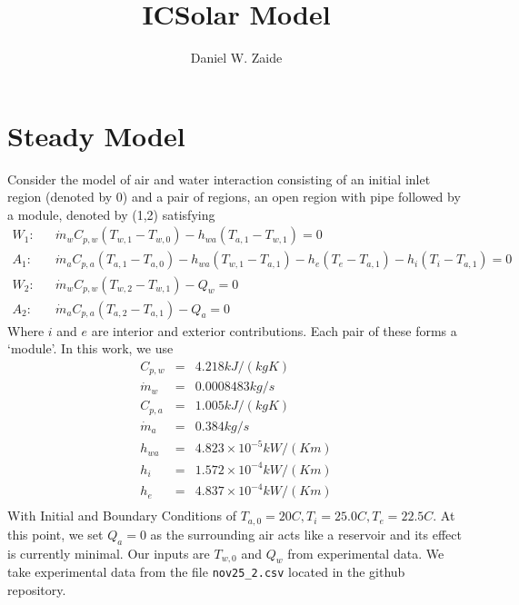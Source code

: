 \documentclass[11pt]{article}
\title{ICSolar Model}
\author{Daniel W. Zaide}
\begin{document}
\maketitle
\section{Steady Model}

Consider the model of air and water interaction consisting of an initial inlet region (denoted by 0) and a pair of regions, an open region with pipe followed by a module, denoted by (1,2) satisfying 
\begin{eqnarray} 
W_1: & & \dot{m}_wC_{p,w}(T_{w,1}-T_{w,0}) - h_{wa}(T_{a,1}-T_{w,1}) = 0 \\
A_1: & & \dot{m}_aC_{p,a}(T_{a,1}-T_{a,0}) - h_{wa}(T_{w,1}-T_{a,1}) - h_{e}(T_e-T_{a,1}) - h_{i}(T_i-T_{a,1})= 0 \\
W_2: & & \dot{m}_wC_{p,w}(T_{w,2}-T_{w,1}) - Q_w = 0\\
A_2: & & \dot{m}_aC_{p,a}(T_{a,2}-T_{a,1}) - Q_a = 0 
\label{eq:steady}
\end{eqnarray}
Where $i$ and $e$ are interior and exterior contributions. Each pair of these forms a `module'. In this work, we use
\begin{eqnarray}
C_{p,w} & = & 4.218 kJ/(kg K) \\
\dot{m}_w & = & 0.0008483 kg/s \\
C_{p,a} & = & 1.005 kJ/(kg K) \\
\dot{m}_a & = & 0.384 kg/s \\
h_{wa} & = & 4.823 \times 10^{-5} kW/(K m)\\
h_{i} & = & 1.572 \times 10^{-4} kW/(K m)\\
h_{e} & = & 4.837 \times 10^{-4} kW/(K m)\\
\end{eqnarray}
With Initial and Boundary Conditions of $T_{a,0} = 20 C, T_i = 25.0 C, T_e = 22.5 C$. At this point, we set $Q_a = 0$ as the surrounding air acts like a reservoir and its effect is currently minimal. Our inputs are $T_{w,0}$ and $Q_w$ from experimental data. We take experimental data from the file \texttt{nov25\_2.csv} located in the github repository. 
\end{document}

